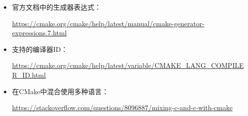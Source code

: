 

\begin{itemize}
\item
官方文档中的生成器表达式：

\url{https://cmake.org/cmake/help/latest/manual/cmake-generator-expressions.7.html}

\item
支持的编译器ID：

\url{https://cmake.org/cmake/help/latest/variable/CMAKE_LANG_COMPILER_ID.html}

\item
在CMake中混合使用多种语言：

\url{https://stackoverflow.com/questions/8096887/mixing-c-and-c-with-cmake}
\end{itemize}